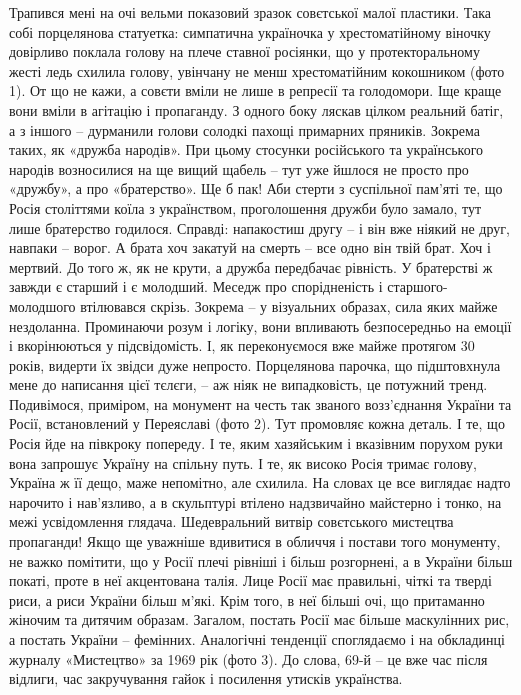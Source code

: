 Трапився мені на очі вельми показовий зразок совєтської малої пластики. Така собі порцелянова статуетка: симпатична україночка у хрестоматійному віночку довірливо поклала голову на плече ставної росіянки, що у протекторальному жесті ледь схилила голову, увінчану не менш хрестоматійним кокошником (фото 1).
От що не кажи, а совєти вміли не лише в репресії та голодомори. Іще краще вони вміли в агітацію і пропаганду. З одного боку ляскав цілком реальний батіг, а з іншого – дурманили голови солодкі пахощі примарних пряників. Зокрема таких, як «дружба народів».
При цьому стосунки російського та українського народів возносилися на ще вищий щабель – тут уже йшлося не просто про «дружбу», а про «братерство». Ще б пак! Аби стерти з суспільної пам’яті те, що Росія століттями коїла з українством, проголошення дружби було замало, тут лише братерство годилося. Справді: напакостиш другу – і він вже ніякий не друг, навпаки – ворог. А брата хоч закатуй на смерть – все одно він твій брат. Хоч і мертвий. До того ж, як не крути, а дружба передбачає рівність. У братерстві ж завжди є старший і є молодший.
Меседж про спорідненість і старшого-молодшого втілювався скрізь. Зокрема – у візуальних образах, сила яких майже нездоланна. Проминаючи розум і логіку, вони впливають безпосередньо на емоції і вкорінюються у підсвідомість. І, як переконуємося вже майже протягом 30 років, видерти їх звідси дуже непросто.
Порцелянова парочка, що підштовхнула мене до написання цієї тєлєги, – аж ніяк не випадковість, це потужний тренд. Подивімося, приміром, на монумент на честь так званого возз’єднання України та Росії, встановлений у Переяславі (фото 2). 
Тут промовляє кожна деталь. І те, що Росія йде на півкроку попереду. І те, яким хазяйським і вказівним порухом руки вона запрошує Україну на спільну путь. І те, як високо Росія тримає голову, Україна ж її дещо, маже непомітно, але схилила. 
На словах це все виглядає надто нарочито і нав’язливо, а в скульптурі втілено надзвичайно майстерно і тонко, на межі усвідомлення глядача. Шедевральний витвір совєтського мистецтва пропаганди!
Якщо ще уважніше вдивитися в обличчя і постави того монументу, не важко помітити, що у Росії плечі рівніші і більш розгорнені, а в України більш покаті, проте в неї акцентована талія. Лице Росії має правильні, чіткі та тверді риси, а риси України більш м’які. Крім того, в неї більші очі, що притаманно жіночим та дитячим образам.  Загалом, постать Росії має більше маскулінних рис, а постать України – фемінних. 
Аналогічні тенденції споглядаємо і на обкладинці журналу «Мистецтво» за 1969 рік (фото 3). До слова, 69-й – це вже час після відлиги, час закручування гайок і посилення утисків українства. 
